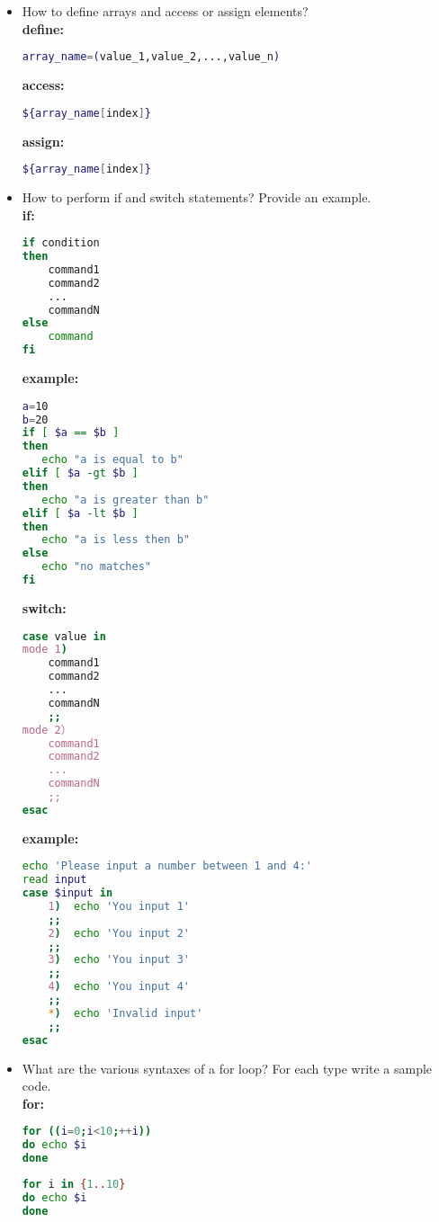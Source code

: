 \documentclass{article}
\begin{document}
\begin{itemize}
\item How to define arrays and access or assign elements?\\
\textbf{define:}
\begin{lstlisting}[language=bash]
array_name=(value_1,value_2,...,value_n)
\end{lstlisting}
\textbf{access:}
\begin{lstlisting}[language=bash]
${array_name[index]}
\end{lstlisting}
\textbf{assign:}
\begin{lstlisting}[language=bash]
${array_name[index]}
\end{lstlisting}
\item How to perform if and switch statements? Provide an example.\\
\textbf{if:}
\begin{lstlisting}[language=bash]
if condition
then
    command1
    command2
    ...
    commandN
else
	command
fi
\end{lstlisting}
\textbf{example:}
\begin{lstlisting}[language=bash]
a=10
b=20
if [ $a == $b ]
then
   echo "a is equal to b"
elif [ $a -gt $b ]
then
   echo "a is greater than b"
elif [ $a -lt $b ]
then
   echo "a is less then b"
else
   echo "no matches"
fi
\end{lstlisting}
\textbf{switch:}
\begin{lstlisting}[language=bash]
case value in
mode 1)
    command1
    command2
    ...
    commandN
    ;;
mode 2）
    command1
    command2
    ...
    commandN
    ;;
esac
\end{lstlisting}
\textbf{example:}
\begin{lstlisting}[language=bash]
echo 'Please input a number between 1 and 4:'
read input
case $input in
    1)  echo 'You input 1'
    ;;
    2)  echo 'You input 2'
    ;;
    3)  echo 'You input 3'
    ;;
    4)  echo 'You input 4'
    ;;
    *)  echo 'Invalid input'
    ;;
esac
\end{lstlisting}
\item What are the various syntaxes of a for loop? For each type write a sample code.\\
\textbf{for:}
\begin{lstlisting}[language=bash]
for ((i=0;i<10;++i))
do echo $i
done
\end{lstlisting}
\begin{lstlisting}[language=bash]
for i in {1..10}
do echo $i
done
\end{lstlisting}
\begin{lstlisting}[language=bash]

\end{lstlisting}
\end{itemize}
\end{document}
